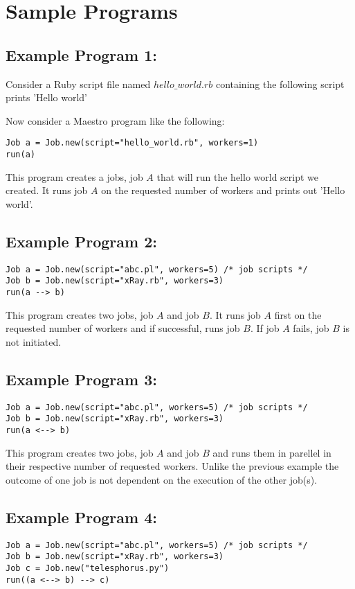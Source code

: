 \section{Sample Programs}
\label{sect:samples}
\subsection*{Example Program 1:}
Consider a Ruby script file named $hello\_world.rb$ containing the following script
prints 'Hello world'

Now consider a Maestro program like the following:
\begin{lstlisting}
Job a = Job.new(script="hello_world.rb", workers=1)
run(a)
\end{lstlisting}

This program creates a jobs, job $A$ that will run the hello world script we created. 
It runs job $A$ on the requested number of workers and prints out 'Hello world'.
\\

\subsection*{Example Program 2:}
\begin{lstlisting}
Job a = Job.new(script="abc.pl", workers=5) /* job scripts */
Job b = Job.new(script="xRay.rb", workers=3)
run(a --> b)
\end{lstlisting}

This program creates two jobs, job $A$ and job $B$. It runs job $A$ first on the requested number of workers
and if successful, runs job $B$. If job $A$ fails, job $B$ is not initiated.
\\

\subsection*{Example Program 3:}
\begin{lstlisting}
Job a = Job.new(script="abc.pl", workers=5) /* job scripts */
Job b = Job.new(script="xRay.rb", workers=3)
run(a <--> b)
\end{lstlisting}

This program creates two jobs, job $A$ and job $B$ and runs them in parellel in their respective number of requested workers.
Unlike the previous example the outcome of one job is not dependent on the execution of the other job(s).
\\

\subsection*{Example Program 4:}
\begin{lstlisting}
Job a = Job.new(script="abc.pl", workers=5) /* job scripts */
Job b = Job.new(script="xRay.rb", workers=3)
Job c = Job.new("telesphorus.py")
run((a <--> b) --> c)
\end{lstlisting}

